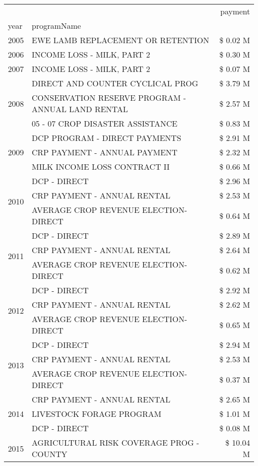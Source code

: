 \begin{tabular}{llr}
\toprule
 &  & payment \\
year & programName &  \\
\midrule
2005 & EWE LAMB REPLACEMENT OR RETENTION & \$ 0.02 M \\
\cline{1-3}
2006 & INCOME LOSS - MILK, PART 2 & \$ 0.30 M \\
\cline{1-3}
2007 & INCOME LOSS - MILK, PART 2 & \$ 0.07 M \\
\cline{1-3}
\multirow[t]{3}{*}{2008} & DIRECT AND COUNTER CYCLICAL PROG & \$ 3.79 M \\
 & CONSERVATION RESERVE PROGRAM - ANNUAL LAND RENTAL & \$ 2.57 M \\
 & 05 - 07 CROP DISASTER ASSISTANCE & \$ 0.83 M \\
\cline{1-3}
\multirow[t]{3}{*}{2009} & DCP PROGRAM - DIRECT PAYMENTS & \$ 2.91 M \\
 & CRP PAYMENT - ANNUAL PAYMENT & \$ 2.32 M \\
 & MILK INCOME LOSS CONTRACT II & \$ 0.66 M \\
\cline{1-3}
\multirow[t]{3}{*}{2010} & DCP - DIRECT & \$ 2.96 M \\
 & CRP PAYMENT - ANNUAL RENTAL & \$ 2.53 M \\
 & AVERAGE CROP REVENUE ELECTION-DIRECT & \$ 0.64 M \\
\cline{1-3}
\multirow[t]{3}{*}{2011} & DCP - DIRECT & \$ 2.89 M \\
 & CRP PAYMENT - ANNUAL RENTAL & \$ 2.64 M \\
 & AVERAGE CROP REVENUE ELECTION-DIRECT & \$ 0.62 M \\
\cline{1-3}
\multirow[t]{3}{*}{2012} & DCP - DIRECT & \$ 2.92 M \\
 & CRP PAYMENT - ANNUAL RENTAL & \$ 2.62 M \\
 & AVERAGE CROP REVENUE ELECTION-DIRECT & \$ 0.65 M \\
\cline{1-3}
\multirow[t]{3}{*}{2013} & DCP - DIRECT & \$ 2.94 M \\
 & CRP PAYMENT - ANNUAL RENTAL & \$ 2.53 M \\
 & AVERAGE CROP REVENUE ELECTION-DIRECT & \$ 0.37 M \\
\cline{1-3}
\multirow[t]{3}{*}{2014} & CRP PAYMENT - ANNUAL RENTAL & \$ 2.65 M \\
 & LIVESTOCK FORAGE PROGRAM & \$ 1.01 M \\
 & DCP - DIRECT & \$ 0.08 M \\
\cline{1-3}
\multirow[t]{3}{*}{2015} & AGRICULTURAL RISK COVERAGE PROG - COUNTY & \$ 10.04 M \\

\end{tabular}

